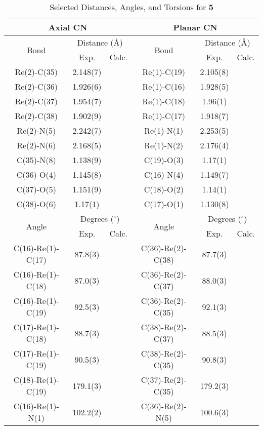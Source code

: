 \begin{table}[htbp]
  \caption{Selected Distances, Angles, and Torsions for \textbf{5}}
  \centering
    \begin{tabular}{cccccc}
    \toprule
    \multicolumn{3}{c}{Axial CN} & \multicolumn{3}{c}{Planar CN} \\ \midrule
    \multirow{2}{*}{Bond} & \multicolumn{2}{c}{Distance (\r{A})} & \multirow{2}{*}{Bond} & \multicolumn{2}{c}{Distance (\r{A})} \\ \cline{2-3} \cline {5-6}
     & Exp. & Calc. & & Exp. & Calc. \\ \midrule
    Re(2)-C(35) & 2.148(7) & & Re(1)-C(19) & 2.105(8) & \\
    Re(2)-C(36) & 1.926(6) & & Re(1)-C(16) & 1.928(5) & \\
    Re(2)-C(37) & 1.954(7) & & Re(1)-C(18) & 1.96(1) & \\
    Re(2)-C(38) & 1.902(9) & & Re(1)-C(17) & 1.918(7) & \\
    Re(2)-N(5) & 2.242(7) & & Re(1)-N(1) & 2.253(5) & \\
    Re(2)-N(6) & 2.168(5) & & Re(1)-N(2) & 2.176(4) & \\
    C(35)-N(8) & 1.138(9) & & C(19)-O(3) & 1.17(1) & \\
    C(36)-O(4) & 1.145(8) & & C(16)-N(4) & 1.149(7) & \\
    C(37)-O(5) & 1.151(9) & & C(18)-O(2) & 1.14(1) & \\
    C(38)-O(6) & 1.17(1) & & C(17)-O(1) & 1.130(8) & \\ \midrule
    \multirow{2}{*}{Angle} & \multicolumn{2}{c}{Degrees ($^\circ$)} & \multirow{2}{*}{Angle} & \multicolumn{2}{c}{Degrees ($^\circ$)} \\ \cline{2-3} \cline {5-6}
     & Exp. & Calc. & & Exp. & Calc. \\ \midrule
    C(16)-Re(1)-C(17) & 87.8(3) & & C(36)-Re(2)-C(38) & 87.7(3) & \\
    C(16)-Re(1)-C(18) & 87.0(3) & & C(36)-Re(2)-C(37) & 88.0(3) & \\
    C(16)-Re(1)-C(19) & 92.5(3) & & C(36)-Re(2)-C(35) & 92.1(3) & \\
    C(17)-Re(1)-C(18) & 88.7(3) & & C(38)-Re(2)-C(37) & 88.5(3) & \\
    C(17)-Re(1)-C(19) & 90.5(3) & & C(38)-Re(2)-C(35) & 90.8(3) & \\
    C(18)-Re(1)-C(19) & 179.1(3) & & C(37)-Re(2)-C(35) & 179.2(3) & \\
    C(16)-Re(1)-N(1) & 102.2(2) & & C(36)-Re(2)-N(5) & 100.6(3) & \\

\end{tabular}
\end{table}
